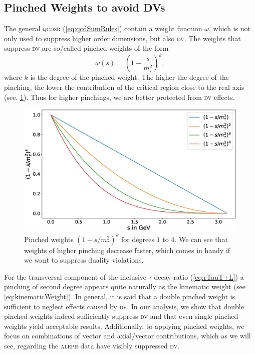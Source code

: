 \documentclass[../../index.tex]{subfiles}
\begin{document}
\subsection{Pinched Weights to avoid DVs}
\label{sec:pinchedWeights}
The general \textsc{qcdsr} (\cref{eq:qcdSumRules}) contain a weight function
\(\omega\), which is not only used to suppress higher order dimensions, but also
\textsc{dv}. The weights that suppress \textsc{dv} are so\-/called pinched
weights of the form
\begin{equation}
  \omega(s) = \left(1-\frac{s}{m_\tau^2}\right)^k,
\end{equation}
where \(k\) is the degree of the pinched weight. The higher the degree of the
pinching, the lower the contribution of the critical region close to the real
axis (see. \cref{fig:monomialWeightGraphs}). Thus for higher pinchings, we are
better protected from \textsc{dv} effects.
\begin{figure}
  \centering
  \includegraphics[width=\textwidth]{./images/monomialWeightGraphs.eps}
  \caption{Pinched weights \((1-s/m_\tau^2)^k\) for degrees \(1\) to \(4\). We
    can see that weights of higher pinching decrease faster, which comes in
    handy if we want to suppress duality violations.}
  \label{fig:monomialWeightGraphs}
\end{figure}
For the transversal component of the inclusive \(\tau\) decay ratio
(\cref{eq:rTauT+L}) a pinching of second degree appears quite naturally as the
kinematic weight (see \cref{eq:kinematicWeight}). In general, it is said that a
double pinched weight is sufficient to neglect effects caused by \textsc{dv}. In
our analysis, we show that double pinched weights indeed sufficiently suppress
\textsc{dv} and that even single pinched weights yield acceptable results.
Additionally, to applying pinched weights, we focus on combinations of vector and
axial\-/vector contributions, which as we will see, regarding the \textsc{aleph}
data have visibly suppressed \textsc{dv}.
\end{document}
